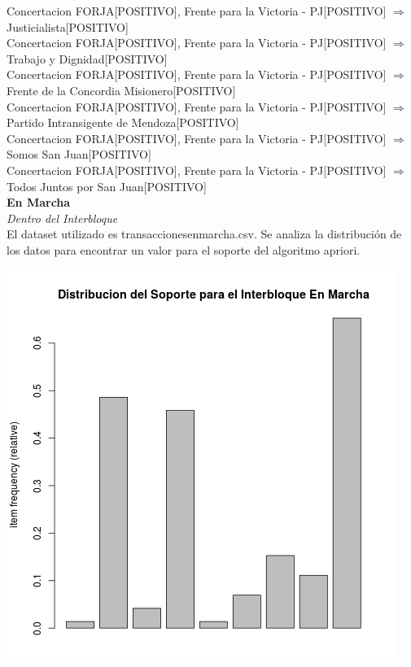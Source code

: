 \documentclass{endm}
\begin{document}
{Concertacion FORJA[POSITIVO], Frente para la Victoria - PJ[POSITIVO]}  $\Longrightarrow$ {Justicialista[POSITIVO]}      \\                    

{Concertacion FORJA[POSITIVO], Frente para la Victoria - PJ[POSITIVO]}  $\Longrightarrow$ {Trabajo y Dignidad[POSITIVO]}     \\                

{Concertacion FORJA[POSITIVO], Frente para la Victoria - PJ[POSITIVO]}  $\Longrightarrow$ {Frente de la Concordia Misionero[POSITIVO]}       \\

{Concertacion FORJA[POSITIVO], Frente para la Victoria - PJ[POSITIVO]}  $\Longrightarrow$ {Partido Intransigente de Mendoza[POSITIVO]}       \\

{Concertacion FORJA[POSITIVO], Frente para la Victoria - PJ[POSITIVO]}  $\Longrightarrow$ {Somos San Juan[POSITIVO]}         \\

{Concertacion FORJA[POSITIVO], Frente para la Victoria - PJ[POSITIVO]}  $\Longrightarrow$ {Todos Juntos por San Juan[POSITIVO]}          \\    

\textbf{En Marcha}\\
\textit{Dentro del Interbloque} \\

El dataset utilizado es transaccionesenmarcha.csv. Se analiza la distribución de los datos para encontrar un valor para el soporte del algoritmo apriori. \\

\begin{center}
\includegraphics[scale=0.4]{graficos/soportesInterbloquesEnMarcha.png}
\end{center}
\end{document}
